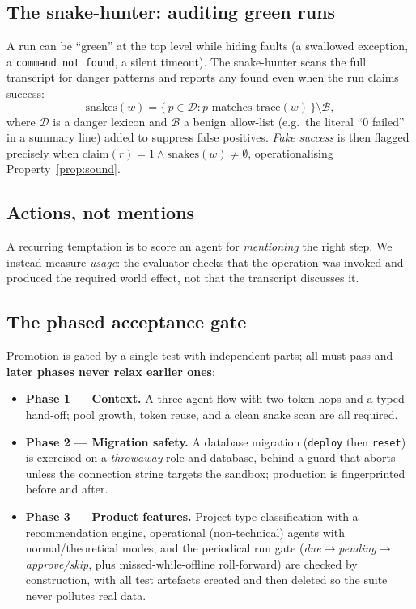 \documentclass[10pt,twocolumn]{article}
\begin{document}
\subsection{The snake-hunter: auditing green runs}
A run can be ``green'' at the top level while hiding faults (a swallowed
exception, a \texttt{command not found}, a silent timeout). The snake-hunter
scans the full transcript for danger patterns and reports any found even when
the run claims success:
\[
\mathrm{snakes}(w) = \{\, p \in \mathcal{D} : p \text{ matches } \mathrm{trace}(w)\,\} \setminus \mathcal{B},
\]
where $\mathcal{D}$ is a danger lexicon and $\mathcal{B}$ a benign allow-list
(e.g.\ the literal ``0 failed'' in a summary line) added to suppress false
positives. \emph{Fake success} is then flagged precisely when
$\mathrm{claim}(r){=}1 \wedge \mathrm{snakes}(w){\neq}\emptyset$, operationalising
Property~\ref{prop:sound}.

\subsection{Actions, not mentions}
A recurring temptation is to score an agent for \emph{mentioning} the right
step. We instead measure \emph{usage}: the evaluator checks that the operation
was invoked and produced the required world effect, not that the transcript
discusses it.

\subsection{The phased acceptance gate}
Promotion is gated by a single test with independent parts; all must pass and
\textbf{later phases never relax earlier ones}:
\begin{itemize}
\item \textbf{Phase 1 --- Context.} A three-agent flow with two token hops and a
typed hand-off; pool growth, token reuse, and a clean snake scan are all
required.
\item \textbf{Phase 2 --- Migration safety.} A database migration
(\texttt{deploy} then \texttt{reset}) is exercised on a \emph{throwaway} role
and database, behind a guard that aborts unless the connection string targets
the sandbox; production is fingerprinted before and after.
\item \textbf{Phase 3 --- Product features.} Project-type classification with a
recommendation engine, operational (non-technical) agents with
normal/theoretical modes, and the periodical run gate
(\emph{due$\to$pending$\to$approve/skip}, plus missed-while-offline roll-forward)
are checked by construction, with all test artefacts created and then deleted so
the suite never pollutes real data.
\end{itemize}
\end{document}
